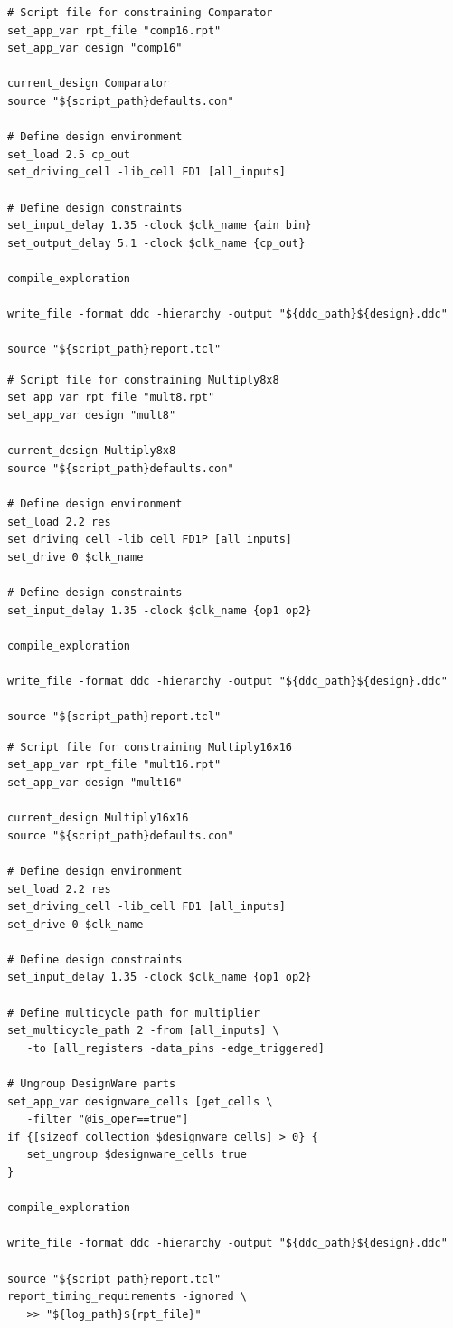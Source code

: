 \begin{lstlisting}[caption={comp16.tcl},label=ex:comp16-tcl]
# Script file for constraining Comparator
set_app_var rpt_file "comp16.rpt"
set_app_var design "comp16"

current_design Comparator
source "${script_path}defaults.con"

# Define design environment
set_load 2.5 cp_out
set_driving_cell -lib_cell FD1 [all_inputs]

# Define design constraints
set_input_delay 1.35 -clock $clk_name {ain bin}
set_output_delay 5.1 -clock $clk_name {cp_out}

compile_exploration

write_file -format ddc -hierarchy -output "${ddc_path}${design}.ddc"

source "${script_path}report.tcl"
\end{lstlisting}

\begin{lstlisting}[caption={mult8.tcl},label=ex:mult8-tcl]
# Script file for constraining Multiply8x8
set_app_var rpt_file "mult8.rpt"
set_app_var design "mult8"

current_design Multiply8x8
source "${script_path}defaults.con"

# Define design environment
set_load 2.2 res
set_driving_cell -lib_cell FD1P [all_inputs]
set_drive 0 $clk_name

# Define design constraints
set_input_delay 1.35 -clock $clk_name {op1 op2}

compile_exploration

write_file -format ddc -hierarchy -output "${ddc_path}${design}.ddc"

source "${script_path}report.tcl"
\end{lstlisting}

\begin{lstlisting}[caption={mult16.tcl},label=ex:mult16-tcl]
# Script file for constraining Multiply16x16
set_app_var rpt_file "mult16.rpt"
set_app_var design "mult16"

current_design Multiply16x16
source "${script_path}defaults.con"

# Define design environment
set_load 2.2 res
set_driving_cell -lib_cell FD1 [all_inputs]
set_drive 0 $clk_name

# Define design constraints
set_input_delay 1.35 -clock $clk_name {op1 op2}

# Define multicycle path for multiplier
set_multicycle_path 2 -from [all_inputs] \
   -to [all_registers -data_pins -edge_triggered]

# Ungroup DesignWare parts
set_app_var designware_cells [get_cells \
   -filter "@is_oper==true"]
if {[sizeof_collection $designware_cells] > 0} {
   set_ungroup $designware_cells true
}

compile_exploration

write_file -format ddc -hierarchy -output "${ddc_path}${design}.ddc"

source "${script_path}report.tcl"
report_timing_requirements -ignored \
   >> "${log_path}${rpt_file}"
\end{lstlisting}

